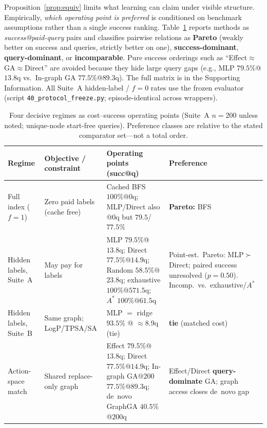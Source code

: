 \documentclass[journal=jcisd8,manuscript=article,email=false]{achemso}
\begin{document}
Proposition~\ref{prop:equiv} limits what learning can claim under visible structure. Empirically, \emph{which operating point is preferred} is conditioned on benchmark assumptions rather than a single success ranking. Table~\ref{tab:regimes} reports methods as \emph{success@paid-query} pairs and classifies pairwise relations as \textbf{Pareto} (weakly better on success and queries, strictly better on one), \textbf{success-dominant}, \textbf{query-dominant}, or \textbf{incomparable}. Pure success orderings such as ``Effect$\approx$GA$\approx$Direct'' are avoided because they hide large query gaps (e.g., MLP $79.5\%$@$13.8$q vs.\ In-graph GA $77.5\%$@$89.3$q). The full matrix is in the Supporting Information. All Suite~A hidden-label / $f{=}0$ rates use the frozen evaluator (script \texttt{40\_protocol\_freeze.py}; episode-identical across wrappers).

\begin{table}[ht]
\caption{Four decisive regimes as cost--success operating points (Suite~A $n{=}200$ unless noted; unique-node start-free queries). Preference classes are relative to the stated comparator set---not a total order.}
\label{tab:regimes}
\centering
\small
\begin{tabular}{lp{3.2cm}p{4.6cm}l}
\toprule
Regime & Objective / constraint & Operating points (succ@q) & Preference \\
\midrule
Full index ($f{=}1$) &
Zero paid labels (cache free) &
Cached BFS $100\%$@$0$q; MLP/Direct also @$0$q but $79.5$/$77.5\%$ &
\textbf{Pareto:} BFS \\
Hidden labels, Suite~A &
May pay for labels &
MLP $79.5\%$@$13.8$q; Direct $77.5\%$@$14.9$q; Random $58.5\%$@$23.8$q; exhaustive $100\%$@$571.5$q; $A^\ast$ $100\%$@$61.5$q &
Point-est.\ Pareto: MLP$\succ$Direct; paired success unresolved ($p{=}0.50$). Incomp.\ vs.\ exhaustive/$A^\ast$ \\
Hidden labels, Suite~B &
Same graph; LogP/TPSA/SA &
MLP $=$ ridge $93.5\%$ @ $\approx$8.9q (tie) &
\textbf{tie} (matched cost) \\
Action-space match &
Shared replace-only graph &
Effect $79.5\%$@$13.8$q; Direct $77.5\%$@$14.9$q; In-graph GA@$200$ $77.5\%$@$89.3$q; de~novo GraphGA $40.5\%$@$200$q &
Effect/Direct \textbf{query-dominate} GA; graph access closes de~novo gap \\
\bottomrule
\end{tabular}
\end{table}
\FloatBarrier
\end{document}
